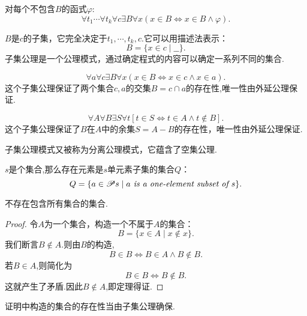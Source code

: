 \begin{axiom}
    对每个不包含$B$的函式$\varphi$:
    \[\forall t_1\cdots\forall t_k\forall c\exists B\forall x(x\in B\iff x\in B \wedge\varphi).\]
\end{axiom}

$B$是$c$的子集，它完全决定于$t_1,\cdots,t_k,c$.它可以用描述法表示：
\[B=\{x\in c\mid\_\_\}.\]
子集公理是一个公理模式，通过确定程式的内容可以确定一系列不同的集合.

\begin{example}
    [子集公理形式的交集]
    \[\forall a\forall c\exists B\forall x(x\in B\iff x\in c\wedge x\in a).\]
    这个子集公理保证了两个集合$c,a$的交集$B=c\cap a$的存在性,唯一性由外延公理保证.
\end{example}

\begin{example}
    [子集公理形式的余集]
    \[\forall A\forall B\exists S\forall t[t\in S\iff t\in A\wedge t\notin B].\]
    这个子集公理保证了$B$在$A$中的余集$S=A-B$的存在性，唯一性由外延公理保证. 
\end{example}

\begin{note}%
    子集公理模式又被称为分离公理模式，它蕴含了空集公理.
\end{note}

\begin{example}
    [单元素子集]
    $s$是个集合,那么存在元素是$s$单元素子集的集合$Q$：
    \[Q=\{a\in\mathscr{P} s\mid a\textit{ is a one-element subset of }s \}.\]
\end{example}

\begin{theorem}
    \label{221225.1}
    不存在包含所有集合的集合.
\end{theorem}

\begin{proof}
    令$A$为一个集合，构造一个不属于$A$的集合：
    \[B=\{x\in A\mid x\notin x\}.\]
    我们断言$B\notin A$.则由$B$的构造,
    \[B\in B\iff B\in A\wedge B\notin B.\]
    若$B\in A$,则简化为
    \[B\in B\iff B\notin B.\]
    这就产生了矛盾.因此$B\notin A$,即定理得证.
\end{proof}
\begin{note}
    证明中构造的集合的存在性当由子集公理确保.
\end{note}

